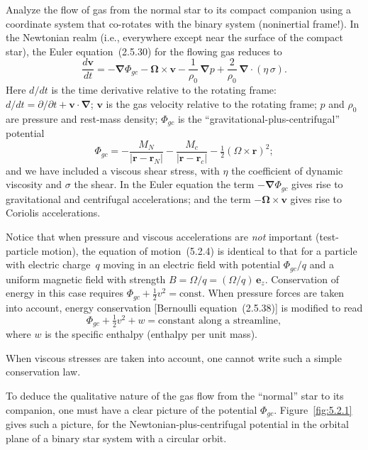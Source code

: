 Analyze the flow of gas from the normal star to its compact companion using
a coordinate system that co-rotates with the binary system (noninertial
frame!).  In the Newtonian realm (i.e., everywhere except near the surface
of the compact star), the Euler equation~(2.5.30) for the flowing gas
reduces to
\begin{equation}
\frac{d\mathbf{v}}{dt}
  = -\boldsymbol{\nabla}\Phi_{gc}
    - \boldsymbol{\Omega}\times\mathbf{v}
    - \frac{1}{\rho_0}\,\boldsymbol{\nabla}p
    + \frac{2}{\rho_0}\,\boldsymbol{\nabla}\cdot(\eta\,\sigma).
\tag{5.2.4}
\end{equation}
Here $d/dt$ is the time derivative relative to the rotating frame:
$d/dt = \partial/\partial t + \mathbf{v}\cdot\boldsymbol{\nabla}$;
$\mathbf{v}$ is the gas velocity relative to the rotating frame; $p$ and
$\rho_0$ are pressure and rest-mass density; $\Phi_{gc}$ is the
``gravitational-plus-centrifugal'' potential
\begin{equation}
\Phi_{gc} = -\frac{M_N}{|\mathbf{r}-\mathbf{r}_N|}
            -\frac{M_c}{|\mathbf{r}-\mathbf{r}_c|}
            -\tfrac{1}{2}(\Omega\times\mathbf{r})^2;
\tag{5.2.5}
\end{equation}
and we have included a viscous shear stress, with $\eta$ the coefficient of
dynamic viscosity and $\sigma$ the shear.  In the Euler equation the term
$-\boldsymbol{\nabla}\Phi_{gc}$ gives rise to gravitational and centrifugal
accelerations; and the term $-\boldsymbol{\Omega}\times\mathbf{v}$ gives
rise to Coriolis accelerations.

Notice that when pressure and viscous accelerations are \emph{not} important
(test-particle motion), the equation of motion~(5.2.4) is identical to that
for a particle with electric charge~$q$ moving in an electric field with
potential $\Phi_{gc}/q$ and a uniform magnetic field with strength
$B = \Omega/q = (\Omega/q)\,\mathbf{e}_z$.  Conservation of energy in this
case requires $\Phi_{gc} + \tfrac{1}{2}v^2 = \text{const}$.  When pressure
forces are taken into account, energy conservation [Bernoulli
equation~(2.5.38)] is modified to read
\begin{equation}
\Phi_{gc} + \tfrac{1}{2}v^2 + w
  = \text{constant along a streamline},
\tag{5.2.6}
\end{equation}
where $w$ is the specific enthalpy (enthalpy per unit mass).

When viscous stresses are taken into account, one cannot write such a simple
conservation law.

To deduce the qualitative nature of the gas flow from the ``normal'' star to
its companion, one must have a clear picture of the potential $\Phi_{gc}$.
Figure~\ref{fig:5.2.1} gives such a picture, for the
Newtonian-plus-centrifugal potential in the orbital plane of a binary star
system with a circular orbit.

